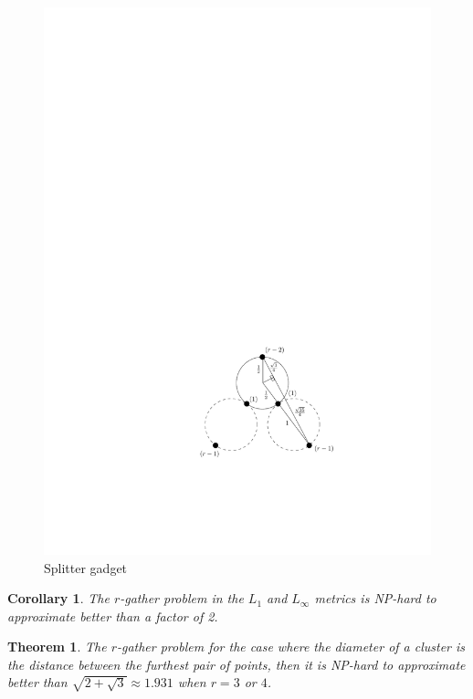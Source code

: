 \documentclass{acm_proc_article-sp}
\newtheorem{theorem}{Theorem}
\newtheorem{corollary}{Corollary}
\begin{document}
\begin{figure}[htbp]
\begin{center}
\includegraphics[scale=.9]{figs/splitter}
\caption{Splitter gadget}
\label{fig:splitter}
\end{center}
\vspace{-5pt}
\end{figure}

\begin{corollary}\label{cor:hardness5}
The $r$-gather problem in the $L_1$ and $L_\infty$ metrics is NP-hard to approximate better than a factor of 2.
\end{corollary}

\begin{theorem}\label{thm:hardness3}
The $r$-gather problem for the case where the diameter of a cluster is the distance between the furthest pair of points, then it is NP-hard to approximate better than $\sqrt{2+\sqrt{3}} \approx 1.931$ when $r=3$ or $4$.
\end{theorem}
\end{document}
